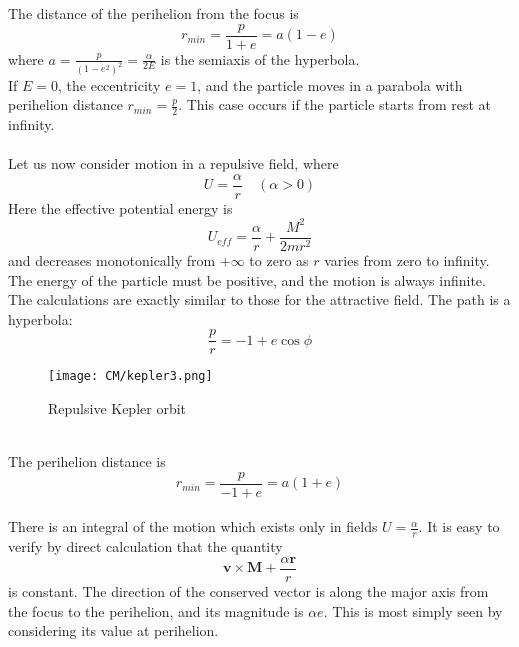 The distance of the perihelion from the focus is
\[r_{min} = \frac{p}{1+e} = a(1-e)\]
where $a = \frac{p}{(1-e^2)^2} = \frac{\alpha}{2E}$ is the semiaxis of the hyperbola.\\
If $E = 0$, the eccentricity $e = 1$, and the particle moves in a parabola with perihelion distance $r_{min} = \frac{p}{2}$. This case occurs if the particle starts from rest
at infinity.\\ \\
Let us now consider motion in a repulsive field, where
\[U= \frac{\alpha}{r} \quad (\alpha > 0)\]
Here the effective potential energy is
\[U_{eff} = \frac{\alpha}{r} + \frac{M^2}{2mr^2}\]
and decreases monotonically from $+\infty$ to zero as $r$ varies from zero to infinity. 
The energy of the particle must be positive, and the motion is always infinite. The calculations are exactly similar to those for the attractive field.
The path is a hyperbola:
\[\frac{p}{r} = -1 + e\cos\phi\]
\begin{figure}[!h]
	\centering
	\texttt{[image: CM/kepler3.png]}
	\caption{Repulsive Kepler orbit}
\end{figure}\\
The perihelion distance is
\[r_{min} = \frac{p}{-1+e} = a(1+e)\]\\
There is an integral of the motion which exists only in fields $U = \frac{\alpha}{r}$. It is easy to verify by direct calculation that the quantity
\[\bm{v}\times\bm{M} + \frac{\alpha \bm{r}}{r}\]
is constant. The direction of the conserved vector is along the major axis from the focus to the perihelion, and its magnitude is $\alpha e$. This is most simply seen by considering its value at perihelion.

